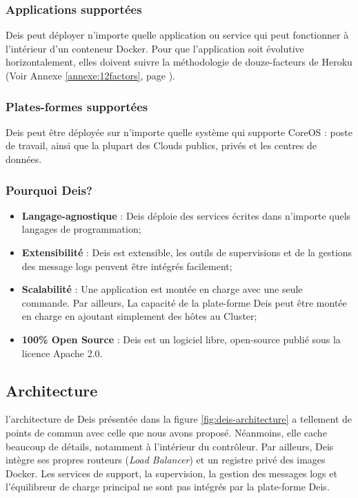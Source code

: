 \begin{onehalfspace}
\subsubsection*{Applications supportées}

Deis peut déployer n'importe quelle application ou service qui peut fonctionner à l'intérieur d'un conteneur Docker. Pour que l'application soit évolutive horizontalement, elles doivent suivre la méthodologie de douze-facteurs de Heroku (Voir Annexe \ref{annexe:12factors}, page \pageref{annexe:12factors}).

\subsubsection*{Plates-formes supportées}
Deis peut être déployée sur n'importe quelle système qui supporte CoreOS : poste de travail, ainsi que la plupart des Clouds publics, privés et les centres de données.


\subsubsection*{Pourquoi Deis?}

\begin{itemize}
	\item \textbf{Langage-agnostique} : Deis déploie des services écrites dans n'importe quels langages de programmation;
	\item \textbf{Extensibilité} : Deis est extensible, les outils de supervisions et de la gestions des message logs peuvent être intégrés facilement;
	\item \textbf{Scalabilité} : Une application est montée en charge avec une seule commande. Par ailleurs, La capacité de la plate-forme Deis peut être montée en charge en ajoutant simplement des hôtes au Cluster;
	\item \textbf{100\% Open Source} : Deis est un logiciel libre, open-source publié sous la licence Apache 2.0.
\end{itemize}


\subsection{Architecture}

l'architecture de Deis présentée dans la figure \ref{fig:deis-architecture} a tellement de points de commun avec celle que nous avons proposé. Néanmoins, elle cache beaucoup de détails, notamment à l'intérieur du contrôleur. Par ailleurs, Deis intègre ses propres routeurs (\emph{Load Balancer}) et un registre privé des images Docker. Les services de support, la supervision, la gestion des messages logs et l'équilibreur de charge principal ne sont pas intégrés par la plate-forme Deis.


\end{onehalfspace}
